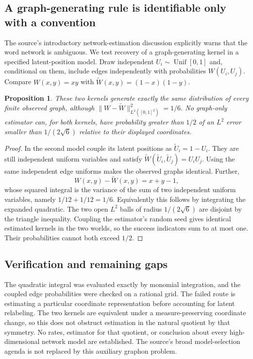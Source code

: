 \documentclass[11pt]{article}
\newtheorem{proposition}{Proposition}
\begin{document}
\subsection{A graph-generating rule is identifiable only with a convention}
The source's introductory network-estimation discussion explicitly warns that the word network is ambiguous. We test recovery of a graph-generating kernel in a specified latent-position model. Draw independent $U_i\sim\operatorname{Unif}[0,1]$ and, conditional on them, include edges independently with probabilities $W(U_i,U_j)$. Compare $W(x,y)=xy$ with $\widetilde W(x,y)=(1-x)(1-y)$.
\begin{proposition}
These two kernels generate exactly the same distribution of every finite observed graph, although $\|W-\widetilde W\|_{L^2([0,1]^2)}^2=1/6$. No graph-only estimator can, for both kernels, have probability greater than $1/2$ of an $L^2$ error smaller than $1/(2\sqrt6)$ relative to their displayed coordinates.
\end{proposition}
\begin{proof}
In the second model couple its latent positions as $\widetilde U_i=1-U_i$. They are still independent uniform variables and satisfy $\widetilde W(\widetilde U_i,\widetilde U_j)=U_iU_j$. Using the same independent edge uniforms makes the observed graphs identical. Further,
\[
W(x,y)-\widetilde W(x,y)=x+y-1,
\]
whose squared integral is the variance of the sum of two independent uniform variables, namely $1/12+1/12=1/6$. Equivalently this follows by integrating the expanded quadratic. The two open $L^2$ balls of radius $1/(2\sqrt6)$ are disjoint by the triangle inequality. Coupling the estimator's random seed gives identical estimated kernels in the two worlds, so the success indicators sum to at most one. Their probabilities cannot both exceed $1/2$.
\end{proof}
\subsection{Verification and remaining gaps}
The quadratic integral was evaluated exactly by monomial integration, and the coupled edge probabilities were checked on a rational grid. The failed route is estimating a particular coordinate representation before accounting for latent relabeling. The two kernels are equivalent under a measure-preserving coordinate change, so this does not obstruct estimation in the natural quotient by that symmetry. No rates, estimator for that quotient, or conclusion about every high-dimensional network model are established. The source's broad model-selection agenda is not replaced by this auxiliary graphon problem.
\end{document}
